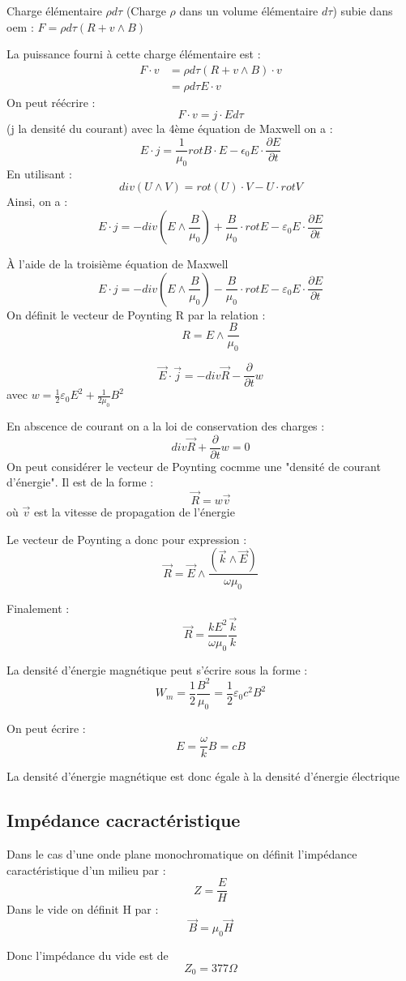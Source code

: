 \documentclass[12pt,a4paper]{report}
\begin{document}
Charge élémentaire \(\rho d \tau\) (Charge \(\rho\) dans un volume élémentaire \(d\tau\)) subie dans oem : \(F = \rho d \tau (R + v \wedge B)\)

La puissance fourni à cette charge élémentaire est :
\begin{align*}
	F \cdot v &= \rho d \tau (R + v \wedge B) \cdot v\\
	&=  \rho d \tau E \cdot v
\end{align*}
On peut réécrire :
\[
	F \cdot v = j \cdot Ed\tau
\]
(j la densité du courant)
avec la 4ème équation de Maxwell on a :
\[
	E\cdot j = \dfrac{1}{\mu_0} rot B \cdot E - \epsilon_0 E \cdot \dfrac{\partial E}{\partial t}
\]
En utilisant :
\[
	div(U \wedge V) = rot (U) \cdot V - U \cdot rot V
\]
Ainsi, on a :
\[
	E \cdot j = -div \left( E \wedge \dfrac{B}{\mu_0} \right) + \dfrac{B}{\mu_0} \cdot rot E - \varepsilon_0 E \cdot \dfrac{\partial E}{\partial t}
\]

À l'aide de la troisième équation de Maxwell 
\[
	E \cdot j = -div \left( E \wedge \dfrac{B}{\mu_0} \right) - \dfrac{B}{\mu_0} \cdot rot E - \varepsilon_0 E \cdot \dfrac{\partial E}{\partial t} 
\]
On définit le vecteur de Poynting R par la relation :
\[
	R = E \wedge \dfrac{B}{\mu_0}
\]

\[
	\vec{E} \cdot \vec{j} = -div \vec{R} - \dfrac{\partial}{\partial t} w
\]
avec \(w = \frac{1}{2} \varepsilon_0 E^2 + \frac{1}{2\mu_0} B^2\)

En abscence de courant on a la loi de conservation des charges :
\[
	div \vec{R} + \dfrac{\partial}{\partial t} w = 0
\]
On peut considérer le vecteur de Poynting cocmme une "densité de courant d'énergie". Il est de la forme :
\[
	\vec{R} = w \vec{v}
\]
où \(\vec{v}\) est la vitesse de propagation de l'énergie

Le vecteur de Poynting a donc pour expression :
\[
	\vec{R} = \vec{E} \wedge \dfrac{(\vec{k} \wedge \vec{E})}{\omega \mu_0}
\]

Finalement :
\[
	\vec{R} = \dfrac{k E^2}{\omega \mu_0} \dfrac{\vec{k}}{k}
\]

La densité d'énergie magnétique peut s'écrire sous la forme :
\[
	W_m = \dfrac{1}{2} \dfrac{B^2}{\mu_0} = \dfrac{1}{2} \varepsilon_0 c^2 B^2
\]

On peut écrire :
\[
	E = \dfrac{\omega}{k} B = cB
\]

La densité d'énergie magnétique est donc égale à la densité d'énergie électrique

\subsection{Impédance cacractéristique}

Dans le cas d'une onde plane monochromatique on définit l'impédance caractéristique d'un milieu par :
\[
	Z = \dfrac{E}{H}
\]
Dans le vide on définit H par :
\[
	\vec{B} = \mu_0 \vec{H}
\]

Donc l'impédance du vide est de 
\[
	Z_0 = 377 \Omega
\]
\end{document}
